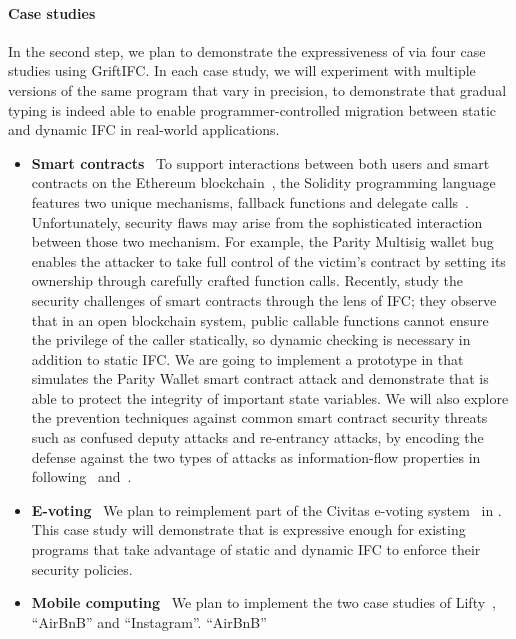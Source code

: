 \paragraph{Case studies} In the second step, we plan to demonstrate
the expressiveness of \SurfacePlus via four case studies using
GriftIFC. In each case study, we will experiment with multiple
versions of the same program that vary in precision, to demonstrate
that gradual typing is indeed able to enable programmer-controlled
migration between static and dynamic IFC in real-world applications.
\begin{itemize}
\item[] \textbf{Smart contracts}~ To support interactions between both users and
  smart contracts on the Ethereum blockchain~\parencite{Wood:aa}, the Solidity
  programming language features two unique mechanisms, fallback functions and
  delegate calls~\parencite{dannen2017solidity}. Unfortunately, security flaws
  may arise from the sophisticated interaction between those two mechanism. For
  example, the Parity Multisig wallet bug \parencite{parity-bug-deep} enables
  the attacker to take full control of the victim's contract by setting its
  ownership through carefully crafted function calls. Recently,
  \textcite{yaoscif} study the security challenges of smart contracts through
  the lens of IFC; they observe that in an open blockchain system, public
  callable functions cannot ensure the privilege of the caller statically, so
  dynamic checking is necessary in addition to static IFC. We are going to
  implement a prototype in \SurfacePlus that simulates the Parity Wallet smart
  contract attack and demonstrate that \SurfacePlus is able to protect the
  integrity of important state variables. We will also explore the prevention
  techniques against common smart contract security threats such as confused
  deputy attacks and re-entrancy attacks, by encoding the defense against the
  two types of attacks as information-flow properties in \SurfacePlus
  following~\textcite{cecchetti2021compositional} and~\textcite{yaoscif}.
\item[] \textbf{E-voting}~ We plan to reimplement part of the Civitas e-voting
  system~\parencite{clarkson2008civitas} in \SurfacePlus. This case study will
  demonstrate that \SurfacePlus is expressive enough for existing programs that
  take advantage of static and dynamic IFC to enforce their security policies.
\item[] \textbf{Mobile computing}~ We plan to implement the two case studies of
  Lifty~\parencite{polikarpova2020liquid}, ``AirBnB'' and ``Instagram''. ``AirBnB''

\end{itemize}
